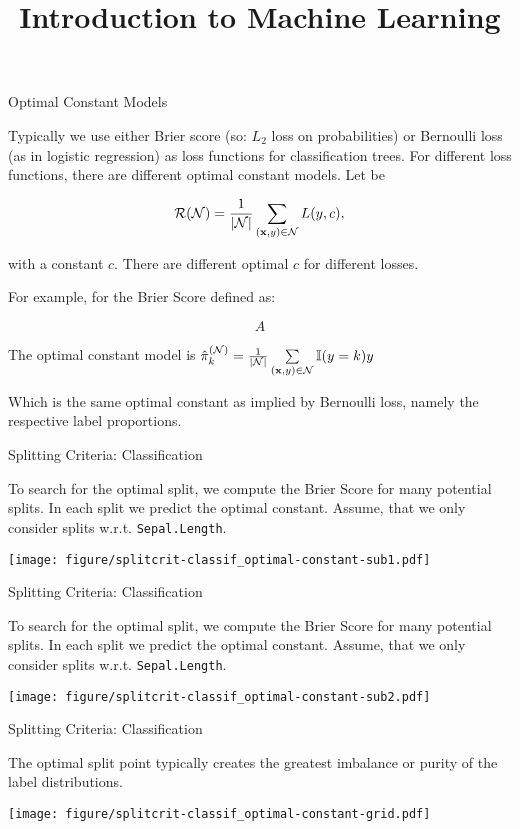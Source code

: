 \documentclass[11pt,compress,t,notes=noshow, xcolor=table]{beamer}
\title{Introduction to Machine Learning}
\institute{\href{https://compstat-lmu.github.io/lecture_i2ml/}{compstat-lmu.github.io/lecture\_i2ml}}
\date{}
\begin{document}
\sloppy

\begin{vbframe}{Optimal Constant Models}

Typically we use either Brier score (so: $L_2$ loss on probabilities) or  Bernoulli loss (as in logistic regression) as loss functions for classification trees.
For different loss functions, there are different optimal constant models.
Let be 

$$\mathcal{R}(\mathcal{N}) = \frac{1}{|\mathcal{N}|} \sum\limits_{(\mathbf{x},y) \in \mathcal{N}} L(y, c),$$

with a constant $c$.
There are different optimal $c$ for different losses.

For example, for the Brier Score defined as:

$$ A $$

The optimal constant model is $\hat\pi_k^{(\mathcal{N})} = \frac{1}{|\mathcal{N}|} \sum\limits_{(\mathbf{x},y) \in \mathcal{N}} \mathbb{I}(y = k)  y$ 

Which is the same optimal constant as implied by Bernoulli loss, namely the respective label proportions.

\end{vbframe}


\begin{vbframe}{Splitting Criteria: Classification}

To search for the optimal split, we compute the Brier Score for many potential splits.
In each split we predict the optimal constant.
Assume, that we only consider splits w.r.t. \texttt{Sepal.Length}.

\texttt{[image: figure/splitcrit-classif\_optimal-constant-sub1.pdf]}

\end{vbframe}

\begin{vbframe}{Splitting Criteria: Classification}

To search for the optimal split, we compute the Brier Score for many potential splits.
In each split we predict the optimal constant.
Assume, that we only consider splits w.r.t. \texttt{Sepal.Length}.

\texttt{[image: figure/splitcrit-classif\_optimal-constant-sub2.pdf]}

\end{vbframe}

\begin{vbframe}{Splitting Criteria: Classification}

The optimal split point typically creates the greatest imbalance or purity of the label distributions.
\lz

\texttt{[image: figure/splitcrit-classif\_optimal-constant-grid.pdf]}

\end{vbframe}
\end{document}
